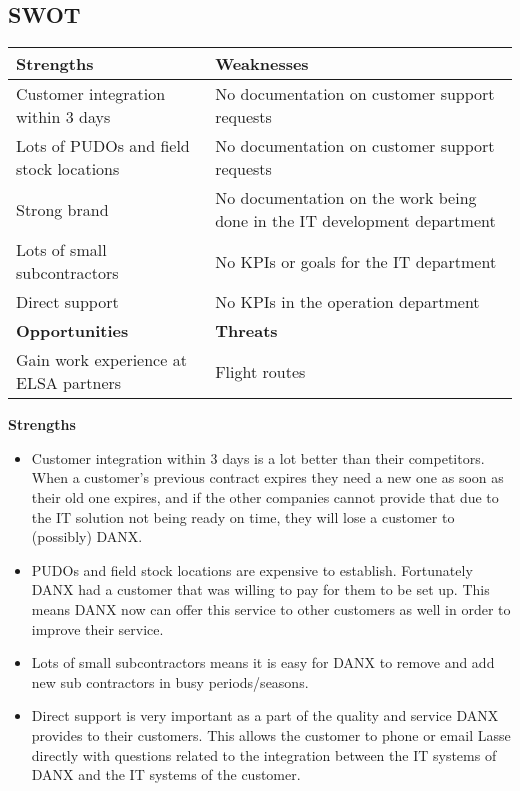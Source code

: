 \subsection{SWOT}

\begin{tabular}{| p{} | p{} |}
\hline
\rowcolor{GR}
\textbf{Strengths} & \textbf{Weaknesses} \\ \hline
Customer integration within 3 days & No documentation on customer support requests \\ \hline
Lots of PUDOs and field stock locations & No documentation on customer support requests \\ \hline
Strong brand & No documentation on the work being done in the IT development department \\ \hline
Lots of small subcontractors & No KPIs or goals for the IT department \\ \hline
Direct support & No KPIs in the operation department \\ \hline \hline
\rowcolor{GR}
\textbf{Opportunities} & \textbf{Threats} \\ \hline
Gain work experience at ELSA partners & Flight routes \\ \hline
\end{tabular}
\qquad

\textbf{Strengths}
\begin{itemize}
\item Customer integration within 3 days is a lot better than their competitors. When a customer’s previous contract expires they need a new one as soon as their old one expires, and if the other companies cannot provide that due to the IT solution not being ready on time, they will lose a customer to (possibly) DANX.
\item PUDOs and field stock locations are expensive to establish. Fortunately DANX had a customer that was willing to pay for them to be set up. This means DANX now can offer this service to other customers as well in order to improve their service.
\item Lots of small subcontractors means it is easy for DANX to remove and add new sub contractors in busy periods/seasons. 
\item Direct support is very important as a part of the quality and service DANX provides to their customers. This allows the customer to phone or email Lasse directly with questions related to the integration between the IT systems of DANX and the IT systems of the customer.
\end{itemize}


